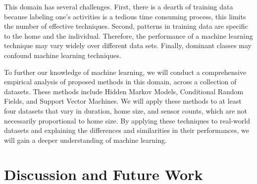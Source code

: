 \documentclass[11pt, oneside]{article}   	%
\begin{document}
	This domain has several challenges.
	First, there is a dearth of training data because labeling one's activities is a tedious time consuming process, this limits the number of effective techniques.
	Second, patterns in training data are specific to the home and the individual.
	Therefore, the performance of a machine learning technique may vary widely over different data sets.
	Finally, dominant classes may confound machine learning techniques.

	To further our knowledge of machine learning, we will conduct a comprehensive empirical analysis of proposed methods in this domain, across a collection of datasets.
	These methods include Hidden Markov Models, Conditional Random Fields, and Support Vector Machines.
	We will apply these methods to at least four datasets that vary in duration, home size, and sensor counts, which are not necessarily proportional to home size.
	By applying these techniques to real-world datasets and explaining the differences and similarities in their performances, we will gain a deeper understanding of machine learning.

\section{Discussion and Future Work}
\end{document}
